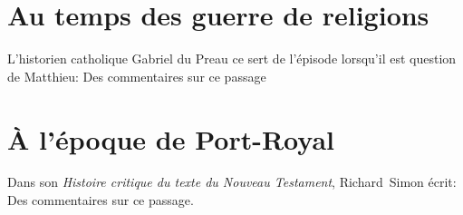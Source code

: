 \documentclass[a4]{article}
\begin{document}
\section{Au temps des guerre de religions}
L'historien catholique Gabriel du Preau ce sert de l'épisode lorsqu'il est question de Matthieu:
Des commentaires sur ce passage

\section{À l'époque de Port-Royal}
Dans son \emph{Histoire critique du texte du Nouveau Testament}, Richard~Simon écrit:
Des commentaires sur ce passage.
\end{document}
